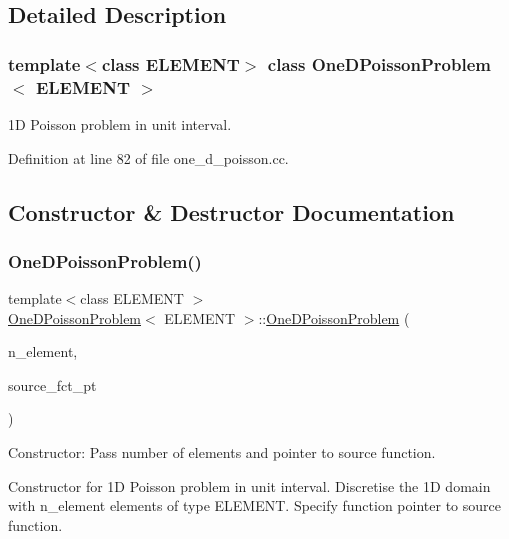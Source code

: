 \subsection{Detailed Description}
\subsubsection*{template$<$class E\+L\+E\+M\+E\+NT$>$\newline
class One\+D\+Poisson\+Problem$<$ E\+L\+E\+M\+E\+N\+T $>$}

1D Poisson problem in unit interval. 

Definition at line 82 of file one\+\_\+d\+\_\+poisson.\+cc.



\subsection{Constructor \& Destructor Documentation}
\mbox{\label{classOneDPoissonProblem_ab814af5dfd3b7ae665cd20e27da5d9ae}} 
\subsubsection{\texorpdfstring{One\+D\+Poisson\+Problem()}{OneDPoissonProblem()}}
{\footnotesize\ttfamily template$<$class E\+L\+E\+M\+E\+NT $>$ \\
\hyperlink{classOneDPoissonProblem}{One\+D\+Poisson\+Problem}$<$ E\+L\+E\+M\+E\+NT $>$\+::\hyperlink{classOneDPoissonProblem}{One\+D\+Poisson\+Problem} (\begin{DoxyParamCaption}\item[{const unsigned \&}]{n\+\_\+element,  }\item[{Poisson\+Equations$<$ 1 $>$\+::Poisson\+Source\+Fct\+Pt}]{source\+\_\+fct\+\_\+pt }\end{DoxyParamCaption})}



Constructor\+: Pass number of elements and pointer to source function. 

Constructor for 1D Poisson problem in unit interval. Discretise the 1D domain with n\+\_\+element elements of type E\+L\+E\+M\+E\+NT. Specify function pointer to source function. 

